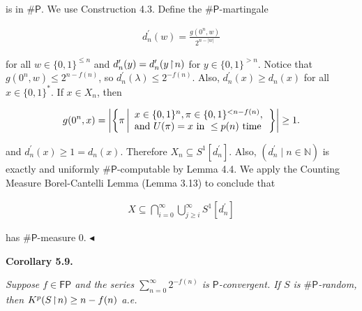 is in ${\mathsf{\#}\mathsf{P}}$.
We use Construction 4.3.
Define the ${\mathsf{\#}\mathsf{P}}$-martingale\par


\[\begin{gathered}
d_{n}^{\prime}(w)=\frac{g(0^{n},w)}{2^{n-|w|}}
\end{gathered}\]


for all $w\in\{0,1\}^{\leq n}$ and $d_{n}^{\prime}(y)=d_{n}^{\prime}(y\negthinspace\upharpoonright\negthinspace n)$ for $y\in\{0,1\}^{>n}.$
Notice that $g(0^{n},w)\leq 2^{n-f(n)}$, so $d_{n}^{\prime}(\lambda)\leq 2^{-f(n)}$.
Also, $d_{n}^{\prime}(x)\geq d_{n}(x)$ for all $x\in\{0,1\}^{*}$.
If $x\in X_{n}$, then\par


\[\begin{gathered}
g(0^{n},x)=\left|\left\{\pi\left|\begin{array}[]{l}x\in\{0,1\}^{n},\pi\in\{0,1\}^{<n-f(n)},\\
\textrm{and }U(\pi)=x\textrm{ in }\leq p(n)\textrm{ time}\end{array}\right.\right\}\right|\geq 1.
\end{gathered}\]


and $d_{n}^{\prime}(x)\geq 1=d_{n}(x).$
Therefore
$X_{n}\subseteq S^{1}[d_{n}^{\prime}].$ Also, $(d_{n}^{\prime}\mid n\in\mathbb{N})$ is exactly and uniformly ${\mathsf{\#}\mathsf{P}}$-computable by Lemma 4.4.
We apply the Counting Measure
Borel-Cantelli Lemma (Lemma 3.13)
to conclude that\par


\[\begin{gathered}
X\subseteq\bigcap_{i=0}^{\infty}\bigcup_{j\geq i}^{\infty}S^{1}[d_{n}^{\prime}]
\end{gathered}\]


has ${\mathsf{\#}\mathsf{P}}$-measure 0.
$\blacktriangleleft$\par





\par\medskip\noindent\textbf{
\textbf{Corollary 5.9}\textbf{.}
}\par



\emph{Suppose $f\in\mathsf{FP}$ and the series $\sum\limits_{n=0}^{\infty}2^{-f(n)}$ is $\mathsf{P}$-convergent.
If $S$ is ${\mathsf{\#}\mathsf{P}}$-random, then $K^{p}(S\negthinspace\upharpoonright\negthinspace n)\geq n-f(n)$ a.e.}\par



